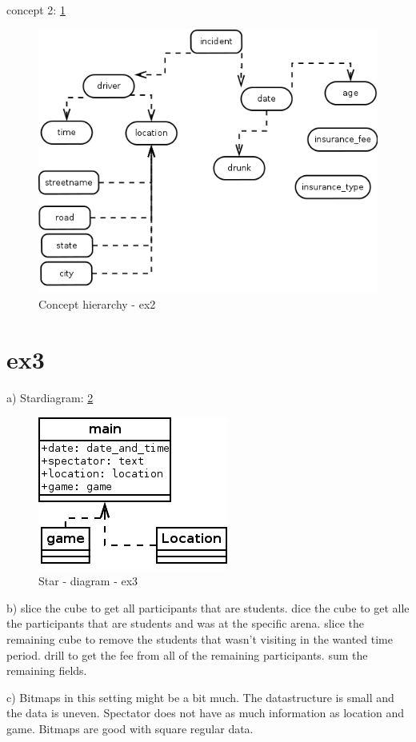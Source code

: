 \documentclass[12pt, a4paper]{article}
\begin{document}
concept 2: \ref{con2}
\begin{figure}[htb]
    \centering
    \includegraphics[width=\textwidth]{concept2}
    \caption{Concept hierarchy - ex2}
    \label{con2}
\end{figure}




\section{ex3}
a)
Stardiagram: \ref{fig5}
\begin{figure}[htb]
	\centering
	\includegraphics[width=\textwidth]{game}
	\caption{Star - diagram - ex3}
	\label{fig5}
\end{figure}

b) 
slice the cube to get all participants that are students.
dice the cube to get alle the participants that are students and was at the specific arena.
slice the remaining cube to remove the students that wasn't visiting in the wanted time period. 
drill to get the fee from all of the remaining participants. 
sum the remaining fields.

c)
Bitmaps in this setting might be a bit much. 
The datastructure is small and the data is uneven. 
Spectator does not have as much information as location and game. 
Bitmaps are good with square regular data. 
\end{document}
